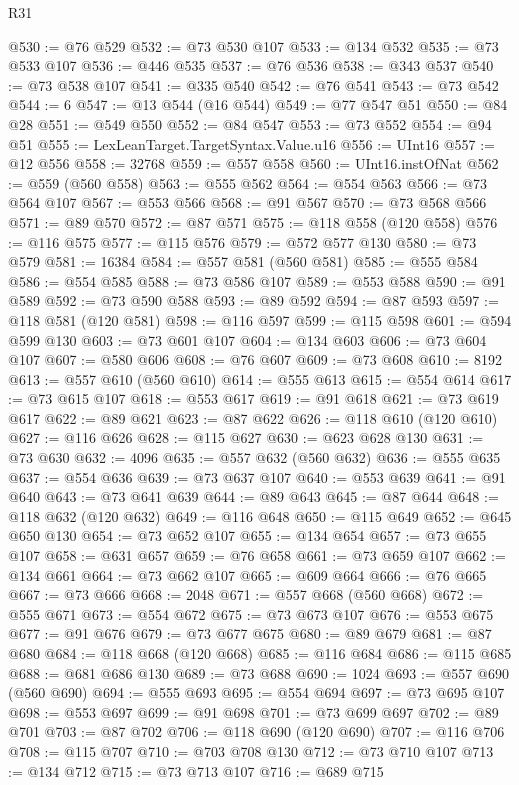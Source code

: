 \begin{lexlean}{R31}
\begin{coremodule}
@530 := @76 @529
@532 := @73 @530 @107
@533 := @134 @532
@535 := @73 @533 @107
@536 := @446 @535
@537 := @76 @536
@538 := @343 @537
@540 := @73 @538 @107
@541 := @335 @540
@542 := @76 @541
@543 := @73 @542
@544 := 6
@547 := @13 @544 (@16 @544)
@549 := @77 @547 @51
@550 := @84 @28
@551 := @549 @550
@552 := @84 @547
@553 := @73 @552
@554 := @94 @51
@555 := LexLeanTarget.TargetSyntax.Value.u16
@556 := UInt16
@557 := @12 @556
@558 := 32768
@559 := @557 @558
@560 := UInt16.instOfNat
@562 := @559 (@560 @558)
@563 := @555 @562
@564 := @554 @563
@566 := @73 @564 @107
@567 := @553 @566
@568 := @91 @567
@570 := @73 @568 @566
@571 := @89 @570
@572 := @87 @571
@575 := @118 @558 (@120 @558)
@576 := @116 @575
@577 := @115 @576
@579 := @572 @577 @130
@580 := @73 @579
@581 := 16384
@584 := @557 @581 (@560 @581)
@585 := @555 @584
@586 := @554 @585
@588 := @73 @586 @107
@589 := @553 @588
@590 := @91 @589
@592 := @73 @590 @588
@593 := @89 @592
@594 := @87 @593
@597 := @118 @581 (@120 @581)
@598 := @116 @597
@599 := @115 @598
@601 := @594 @599 @130
@603 := @73 @601 @107
@604 := @134 @603
@606 := @73 @604 @107
@607 := @580 @606
@608 := @76 @607
@609 := @73 @608
@610 := 8192
@613 := @557 @610 (@560 @610)
@614 := @555 @613
@615 := @554 @614
@617 := @73 @615 @107
@618 := @553 @617
@619 := @91 @618
@621 := @73 @619 @617
@622 := @89 @621
@623 := @87 @622
@626 := @118 @610 (@120 @610)
@627 := @116 @626
@628 := @115 @627
@630 := @623 @628 @130
@631 := @73 @630
@632 := 4096
@635 := @557 @632 (@560 @632)
@636 := @555 @635
@637 := @554 @636
@639 := @73 @637 @107
@640 := @553 @639
@641 := @91 @640
@643 := @73 @641 @639
@644 := @89 @643
@645 := @87 @644
@648 := @118 @632 (@120 @632)
@649 := @116 @648
@650 := @115 @649
@652 := @645 @650 @130
@654 := @73 @652 @107
@655 := @134 @654
@657 := @73 @655 @107
@658 := @631 @657
@659 := @76 @658
@661 := @73 @659 @107
@662 := @134 @661
@664 := @73 @662 @107
@665 := @609 @664
@666 := @76 @665
@667 := @73 @666
@668 := 2048
@671 := @557 @668 (@560 @668)
@672 := @555 @671
@673 := @554 @672
@675 := @73 @673 @107
@676 := @553 @675
@677 := @91 @676
@679 := @73 @677 @675
@680 := @89 @679
@681 := @87 @680
@684 := @118 @668 (@120 @668)
@685 := @116 @684
@686 := @115 @685
@688 := @681 @686 @130
@689 := @73 @688
@690 := 1024
@693 := @557 @690 (@560 @690)
@694 := @555 @693
@695 := @554 @694
@697 := @73 @695 @107
@698 := @553 @697
@699 := @91 @698
@701 := @73 @699 @697
@702 := @89 @701
@703 := @87 @702
@706 := @118 @690 (@120 @690)
@707 := @116 @706
@708 := @115 @707
@710 := @703 @708 @130
@712 := @73 @710 @107
@713 := @134 @712
@715 := @73 @713 @107
@716 := @689 @715

\end{coremodule}
\end{lexlean}
